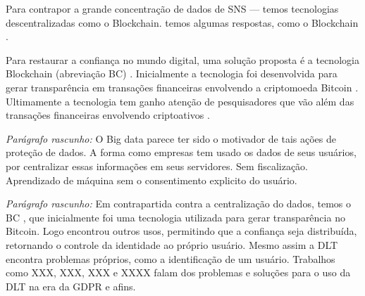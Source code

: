 
Para contrapor a grande concentração de dados de SNS --- temos tecnologias descentralizadas como o Blockchain. temos algumas respostas, como o Blockchain \citep{Schwerin2018}.

Para restaurar a confiança no mundo digital, uma solução proposta é a tecnologia Blockchain (abreviação BC) \citep{Schwerin2018}. Inicialmente a tecnologia foi desenvolvida para gerar transparência em transações financeiras envolvendo a criptomoeda Bitcoin \citep{Nakamoto2009}. Ultimamente a tecnologia tem ganho atenção de pesquisadores que vão além das transações financeiras envolvendo criptoativos \citep{Al-ZabenNasr2018:article}.

\textit{Parágrafo rascunho:} 
O Big data parece ter sido o motivador de tais ações de proteção de dados. A forma como empresas tem usado os dados de seus usuários, por centralizar essas informações em seus servidores. Sem fiscalização. Aprendizado de máquina sem o consentimento explicito do usuário. 

\textit{Parágrafo rascunho:} 
Em contrapartida contra a centralização do dados, temos o BC \citep{Nakamoto2009}, que inicialmente foi uma tecnologia utilizada para gerar transparência no Bitcoin. Logo encontrou outros usos, permitindo que a confiança seja distribuída, retornando o controle da identidade ao próprio usuário. Mesmo assim a DLT encontra problemas próprios, como a identificação de um usuário. Trabalhos como XXX, XXX, XXX e XXXX falam dos problemas e soluções para o uso da DLT na era da GDPR e afins.




